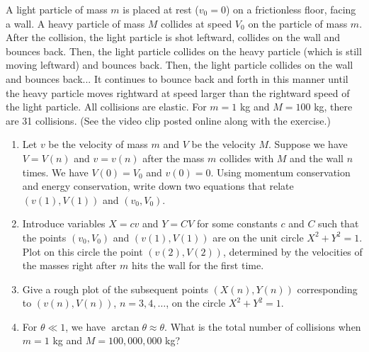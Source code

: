 \documentclass{article}
\begin{document}
\begin{problem}
A light particle of mass $m$ is placed at rest ($v_0=0$) on a frictionless floor, facing a wall. A heavy particle of mass $M$ collides at speed $V_0$ on the particle of mass $m$. After the collision, the light particle is shot leftward, collides on the wall and bounces back. Then, the light particle collides on the heavy particle (which is still moving leftward) and bounces back. Then, the light particle collides on the wall and bounces back... It continues to bounce back and forth in this manner until the heavy particle moves rightward at speed larger than the rightward speed of the light particle. All collisions are elastic. For $m=1$ kg and $M=100$ kg, there are 31 collisions. (See the video clip posted online along with the exercise.)
\begin{center}
\end{center}
\begin{enumerate}
  \item[(a)] Let $v$ be the velocity of mass $m$ and $V$ be the velocity $M$. Suppose we have $V=V(n)$ and $v=v(n)$ after the mass $m$ collides with $M$ and the wall $n$ times. We have $V(0)=V_0$ and $v(0)=0$. Using momentum conservation and energy conservation, write down two equations that relate $(v(1),V(1))$ and $(v_0,V_0)$.
  \item[(b)] Introduce variables $X=cv$ and $Y=CV$ for some constants $c$ and $C$ such that the points $(v_0,V_0)$ and $(v(1),V(1))$ are on the unit circle $X^2+Y^2=1$. Plot on this circle the point $(v(2),V(2))$, determined by the velocities of the masses right after $m$ hits the wall for the first time.
  \item[(c)] Give a rough plot of the subsequent points $(X(n),Y(n))$ corresponding to $(v(n),V(n))$, $n=3,4,\ldots$, on the circle $X^2+Y^2=1$.
  \item[(d)] For $\theta\ll1$, we have $\arctan\theta\approx\theta$. What is the total number of collisions when $m=1$ kg and $M=100,000,000$ kg?
\end{enumerate}
\end{problem}
\end{document}
